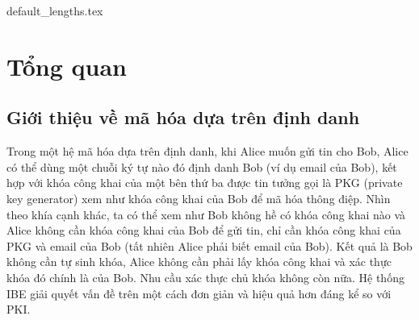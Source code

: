 \documentclass[class=report, crop=false]{standalone}
\begin{document}
	{default_lengths.tex}
	\baselineskip
	\chapter{Tổng quan}
	\section{Giới thiệu về mã hóa dựa trên định danh}
		Trong một hệ mã hóa dựa trên định danh, khi Alice muốn gửi tin cho Bob, Alice có thể dùng một chuỗi ký tự nào đó định danh Bob (ví dụ email của Bob), kết hợp với khóa công khai của một bên thứ ba được tin tưởng gọi là PKG (private key generator) xem như khóa công khai của Bob để mã hóa thông điệp. Nhìn theo khía cạnh khác, ta có thể xem như Bob không hề có khóa công khai nào và Alice không cần khóa công khai của Bob để gửi tin, chỉ cần khóa công khai của PKG và email của Bob (tất nhiên Alice phải biết email của Bob). Kết quả là Bob không cần tự sinh khóa, Alice không cần phải lấy khóa công khai và xác thực khóa đó chính là của Bob. Nhu cầu xác thực chủ khóa không còn nữa. Hệ thống IBE giải quyết vấn đề trên một cách đơn giản và hiệu quả hơn đáng kể so với PKI.
\end{document}
